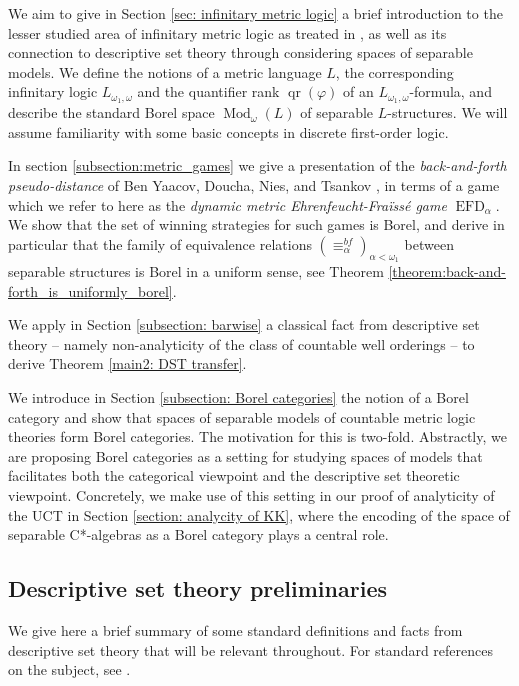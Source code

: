 \documentclass[12pt]{amsart}
\DeclareMathOperator{\EFD}{EFD}
\DeclareMathOperator{\qr}{qr}
\DeclareMathOperator{\Mod}{Mod}
\begin{document}
We aim to give in Section \ref{sec: infinitary metric logic} a brief introduction to the lesser studied area of infinitary metric logic as treated in \cite{yaacov2017metric}, as well as its connection to descriptive set theory through considering spaces of separable models. We define the notions of a metric language $L$, the corresponding infinitary logic $L_{\omega_1, \omega}$ and the quantifier rank $\qr(\varphi)$ of an $L_{\omega_1, \omega}$-formula, and describe the standard Borel space $\Mod_\omega(L)$ of separable $L$-structures.
We will assume familiarity with some basic concepts in discrete first-order logic. 

In section \ref{subsection:metric_games} we give a presentation of the \textit{back-and-forth pseudo-distance} of Ben Yaacov, Doucha, Nies, and Tsankov \cite{yaacov2017metric}, in terms of a game which we refer to here as the \textit{dynamic metric Ehrenfeucht-Fra\"iss\'e game} $\EFD_{\alpha}$. We show that the set of winning strategies for such games is Borel, and derive in particular that the family of equivalence relations $(\equiv_\alpha^{bf})_{\alpha<\omega_1}$ between separable structures is Borel in a uniform sense, see Theorem \ref{theorem:back-and-forth_is_uniformly_borel}.

We apply in Section \ref{subsection: barwise} a classical fact from descriptive set theory -- namely non-analyticity of the class of countable well orderings -- to derive Theorem \ref{main2: DST transfer}. 

We introduce in Section \ref{subsection: Borel categories} the notion of a Borel category and show that spaces of separable models of countable metric logic theories form Borel categories. The motivation for this is two-fold. Abstractly, we are proposing Borel categories as a setting for studying spaces of models that facilitates both the categorical viewpoint and the descriptive set theoretic viewpoint. Concretely, we make use of this setting in our proof of analyticity of the UCT in Section \ref{section: analycity of KK}, where the encoding of the space of separable C*-algebras as a Borel category plays a central role.


\subsection{Descriptive set theory preliminaries}\label{subsection: DST preliminaries}
We give here a brief summary of some standard definitions and facts from descriptive set theory that will be relevant throughout. For standard references on the subject, see \cite{MR1321597, MR561709}.
\end{document}
